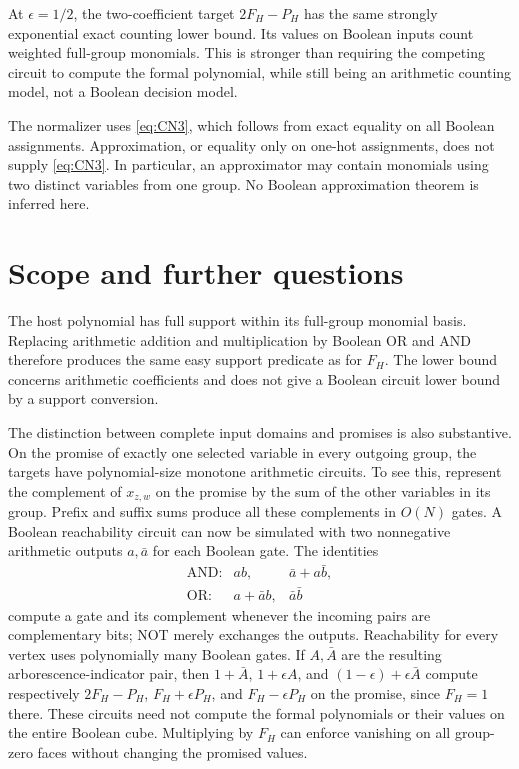 \documentclass[11pt]{article}
\theoremstyle{definition}
\theoremstyle{remark}
\numberwithin{equation}{section}
\begin{document}
At \(\epsilon=1/2\), the two-coefficient target \(2F_H-P_H\)
has the same strongly exponential exact counting lower
bound. Its values on Boolean inputs count weighted full-group
monomials. This is stronger than requiring the competing
circuit to compute the formal polynomial, while still being
an arithmetic counting model, not a Boolean decision model.

The normalizer uses \eqref{eq:CN3}, which follows from exact equality
on all Boolean assignments. Approximation, or equality only
on one-hot assignments, does not supply \eqref{eq:CN3}. In particular,
an approximator may contain monomials using two distinct
variables from one group. No Boolean approximation theorem
is inferred here.


\section{Scope and further questions}\label{sec:scope}

The host polynomial has full support within its full-group monomial
basis. Replacing arithmetic addition and multiplication by Boolean OR
and AND therefore produces the same easy support predicate as for
\(F_H\). The lower bound concerns arithmetic coefficients and does
not give a Boolean circuit lower bound by a support conversion.

The distinction between complete input domains and promises is also
substantive. On the promise of exactly one selected variable in every
outgoing group, the targets have polynomial-size monotone arithmetic
circuits. To see this, represent the complement of \(x_{z,w}\) on
the promise by the sum of the other variables in its group.
Prefix and suffix sums produce all these complements in \(O(N)\) gates.
A Boolean reachability circuit can now be simulated with two
nonnegative arithmetic outputs \(a,\bar a\) for each Boolean gate.
The identities
\[
\begin{array}{lll}
\text{AND:}&ab,&\bar a+a\bar b,\\
\text{OR:}&a+\bar a b,&\bar a\bar b
\end{array}
\]
compute a gate and its complement whenever the incoming pairs are
complementary bits; NOT merely exchanges the outputs.
Reachability for every vertex uses polynomially many Boolean gates.
If \(A,\bar A\) are the resulting arborescence-indicator pair, then
\(1+\bar A\), \(1+\epsilon A\), and
\((1-\epsilon)+\epsilon\bar A\) compute respectively
\(2F_H-P_H\), \(F_H+\epsilon P_H\), and \(F_H-\epsilon P_H\)
on the promise, since \(F_H=1\) there.
These circuits need not compute the formal polynomials or their values
on the entire Boolean cube. Multiplying by \(F_H\) can enforce vanishing
on all group-zero faces without changing the promised values.
\end{document}
